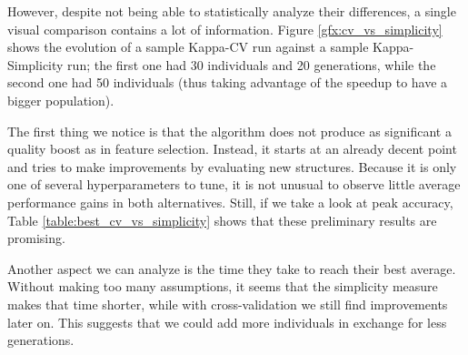 	However, despite not being able to statistically analyze their differences, a single visual comparison contains a lot of information. Figure \ref{gfx:cv_vs_simplicity} shows the evolution of a sample Kappa-CV run against a sample Kappa-Simplicity run; the first one had 30 individuals and 20 generations, while the second one had 50 individuals (thus taking advantage of the speedup to have a bigger population).

	The first thing we notice is that the algorithm does not produce as significant a quality boost as in feature selection. Instead, it starts at an already decent point and tries to make improvements by evaluating new structures. Because it is only one of several hyperparameters to tune, it is not unusual to observe little average performance gains in both alternatives. Still, if we take a look at peak accuracy, Table \ref{table:best_cv_vs_simplicity} shows that these preliminary results are promising.

	Another aspect we can analyze is the time they take to reach their best average. Without making too many assumptions, it seems that the simplicity measure makes that time shorter, while with cross-validation we still find improvements later on. This suggests that we could add more individuals in exchange for less generations.

\newpage

